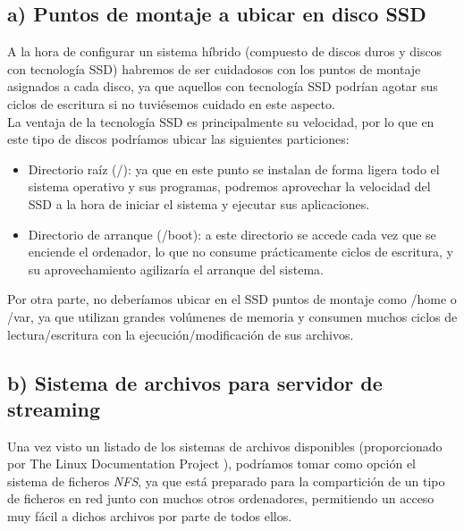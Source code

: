 \subsection{a) Puntos de montaje a ubicar en disco SSD}
A la hora de configurar un sistema híbrido (compuesto de discos duros y discos con tecnología SSD) habremos de ser cuidadosos con los
puntos de montaje asignados a cada disco, ya que aquellos con tecnología SSD podrían agotar sus ciclos de escritura si no tuviésemos
cuidado en este aspecto. \\
La ventaja de la tecnología SSD es principalmente su velocidad, por lo que en este tipo de discos podríamos ubicar las siguientes
particiones:
\begin{itemize}
	\item Directorio raíz (/): ya que en este punto se instalan de forma ligera todo el sistema operativo y sus programas, podremos
	aprovechar la velocidad del SSD a la hora de iniciar el sistema y ejecutar sus aplicaciones.
	\item Directorio de arranque (/boot): a este directorio se accede cada vez que se enciende el ordenador, lo que no consume prácticamente
	ciclos de escritura, y su aprovechamiento agilizaría el arranque del sistema.
\end{itemize}
Por otra parte, no deberíamos ubicar en el SSD puntos de montaje como /home o /var, ya que utilizan grandes volúmenes de memoria y
consumen muchos ciclos de lectura/escritura con la ejecución/modificación de sus archivos.

\subsection{b) Sistema de archivos para servidor de streaming}
Una vez visto un listado de los sistemas de archivos disponibles (proporcionado por The Linux Documentation Project \cite{filesystems}),
podríamos tomar como opción el sistema de ficheros \emph{NFS}, ya que está preparado para la compartición de un tipo de ficheros en red
junto con muchos otros ordenadores, permitiendo un acceso muy fácil a dichos archivos por parte de todos ellos.


